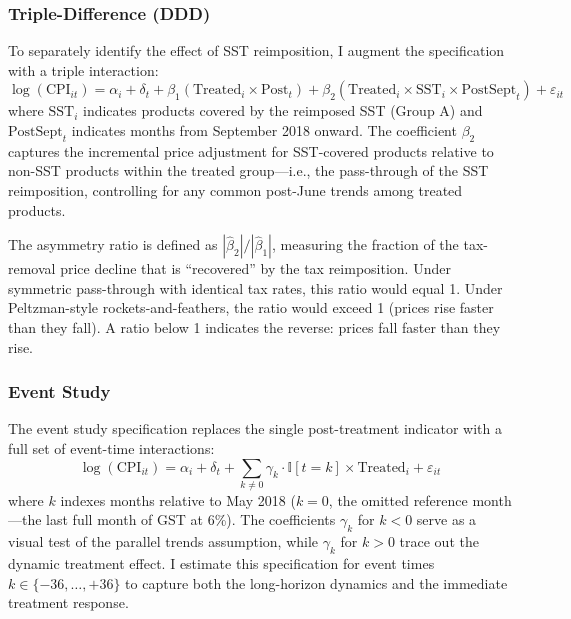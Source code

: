 \documentclass[12pt]{article}
\newcommand{\ind}{\mathbb{I}}
\begin{document}
\subsubsection{Triple-Difference (DDD)}

To separately identify the effect of SST reimposition, I augment the specification with a triple interaction:
\begin{equation}
\log(\text{CPI}_{it}) = \alpha_i + \delta_t + \beta_1 (\text{Treated}_i \times \text{Post}_t) + \beta_2 (\text{Treated}_i \times \text{SST}_i \times \text{PostSept}_t) + \varepsilon_{it}
\label{eq:ddd}
\end{equation}
where $\text{SST}_i$ indicates products covered by the reimposed SST (Group A) and $\text{PostSept}_t$ indicates months from September 2018 onward. The coefficient $\beta_2$ captures the incremental price adjustment for SST-covered products relative to non-SST products within the treated group---i.e., the pass-through of the SST reimposition, controlling for any common post-June trends among treated products.

The asymmetry ratio is defined as $|\hat{\beta}_2| / |\hat{\beta}_1|$, measuring the fraction of the tax-removal price decline that is ``recovered'' by the tax reimposition. Under symmetric pass-through with identical tax rates, this ratio would equal 1. Under Peltzman-style rockets-and-feathers, the ratio would exceed 1 (prices rise faster than they fall). A ratio below 1 indicates the reverse: prices fall faster than they rise.

\subsubsection{Event Study}

The event study specification replaces the single post-treatment indicator with a full set of event-time interactions:
\begin{equation}
\log(\text{CPI}_{it}) = \alpha_i + \delta_t + \sum_{k \neq 0} \gamma_k \cdot \ind[t = k] \times \text{Treated}_i + \varepsilon_{it}
\label{eq:eventstudy}
\end{equation}
where $k$ indexes months relative to May 2018 ($k = 0$, the omitted reference month---the last full month of GST at 6\%). The coefficients $\gamma_k$ for $k < 0$ serve as a visual test of the parallel trends assumption, while $\gamma_k$ for $k > 0$ trace out the dynamic treatment effect. I estimate this specification for event times $k \in \{-36, \ldots, +36\}$ to capture both the long-horizon dynamics and the immediate treatment response.
\end{document}
